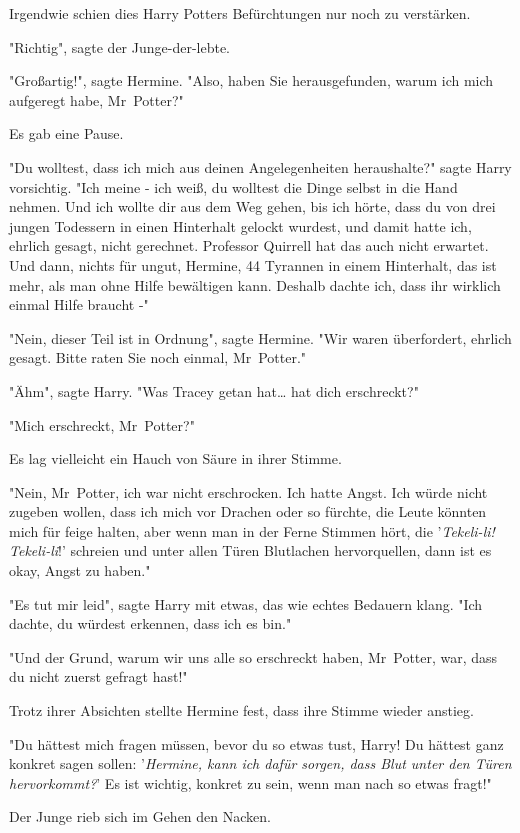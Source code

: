 {Irgendwie schien dies Harry Potters Befürchtungen nur noch zu verstärken.

"Richtig", sagte der Junge-der-lebte.

"Großartig!", sagte Hermine. "Also, haben Sie herausgefunden, warum ich mich aufgeregt habe, Mr~Potter?"

Es gab eine Pause.

"Du wolltest, dass ich mich aus deinen Angelegenheiten heraushalte?" sagte Harry vorsichtig. "Ich meine - ich weiß, du wolltest die Dinge selbst in die Hand nehmen. Und ich wollte dir aus dem Weg gehen, bis ich hörte, dass du von drei jungen Todessern in einen Hinterhalt gelockt wurdest, und damit hatte ich, ehrlich gesagt, nicht gerechnet. Professor Quirrell hat das auch nicht erwartet. Und dann, nichts für ungut, Hermine, 44 Tyrannen in einem Hinterhalt, das ist mehr, als man ohne Hilfe bewältigen kann. Deshalb dachte ich, dass ihr wirklich einmal Hilfe braucht -"

"Nein, dieser Teil ist in Ordnung", sagte Hermine. "Wir waren überfordert, ehrlich gesagt. Bitte raten Sie noch einmal, Mr~Potter."

"Ähm", sagte Harry. "Was Tracey getan hat… hat dich erschreckt?"

"Mich erschreckt, Mr~Potter?"

Es lag vielleicht ein Hauch von Säure in ihrer Stimme.

"Nein, Mr~Potter, ich war nicht erschrocken. Ich hatte Angst. Ich würde nicht zugeben wollen, dass ich mich vor Drachen oder so fürchte, die Leute könnten mich für feige halten, aber wenn man in der Ferne Stimmen hört, die '\emph{Tekeli-li! Tekeli-li}!' schreien und unter allen Türen Blutlachen hervorquellen, dann ist es okay, Angst zu haben."

"Es tut mir leid", sagte Harry mit etwas, das wie echtes Bedauern klang. "Ich dachte, du würdest erkennen, dass ich es bin."

"Und der Grund, warum wir uns alle so erschreckt haben, Mr~Potter, war, dass du nicht zuerst gefragt hast!"

Trotz ihrer Absichten stellte Hermine fest, dass ihre Stimme wieder anstieg.

"Du hättest mich fragen müssen, bevor du so etwas tust, Harry! Du hättest ganz konkret sagen sollen: '\emph{Hermine, kann ich dafür sorgen, dass Blut unter den Türen hervorkommt?}' Es ist wichtig, konkret zu sein, wenn man nach so etwas fragt!"

Der Junge rieb sich im Gehen den Nacken.

}
